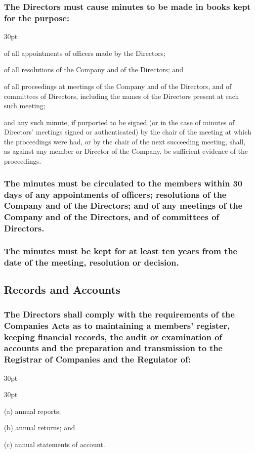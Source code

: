 \documentclass[12pt]{article}
\def\clauseindent{30pt}
\newenvironment{subindentpara}{\raggedright\begin{adjustwidth}{\clauseindent}{}\begin{hanginglist}}{\end{hanginglist}\end{adjustwidth}}
\newenvironment{subindentlist}{\raggedright\begin{adjustwidth}{\clauseindent}{}\begin{labeledlist}{\clauseindent}}{\end{labeledlist}\end{adjustwidth}}
\begin{document}
\subsubsection[Specifics of Records of Minutes]{The Directors must cause minutes to be made in books kept for the purpose:}
\begin{subindentpara}
    \item of all appointments of officers made by the Directors;
    \item of all resolutions of the Company and of the Directors; and
    \item of all proceedings at meetings of the Company and of the Directors, and of committees of Directors, including the names of the Directors present at each such meeting;
    \item and any such minute, if purported to be signed (or in the case of minutes of Directors' meetings signed or authenticated) by the chair of the meeting at which the proceedings were had, or by the chair of the next succeeding meeting, shall, as against any member or Director of the Company, be sufficient evidence of the proceedings.
\end{subindentpara}
\subsubsection[Circulation of Minutes]{The minutes must be circulated to the members within 30 days of any appointments of officers; resolutions of the Company and of the Directors; and of any meetings of the Company and of the Directors, and of committees of Directors.}
\subsubsection[Archives of Minutes]{The minutes must be kept for at least ten years from the date of the meeting, resolution or decision.}

\subsection{Records and Accounts}
\subsubsection[Specifics of Records and Accounts]{The Directors shall comply with the requirements of the Companies Acts as to maintaining a members' register, keeping financial records, the audit or examination of accounts and the preparation and transmission to the Registrar of Companies and the Regulator of:}
\begin{subindentlist}
    \item [(a)] annual reports;
    \item [(b)] annual returns; and
    \item [(c)] annual statements of account.
\end{subindentlist}
\end{document}
